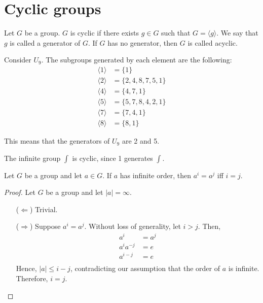\section{Cyclic groups}
    \renewcommand{\leftmark}{March 06, 2024}

    \begin{dfn}
        Let \(G\) be a group. \(G\) is cyclic if there exists \(g\in G\) such that \(G = \langle g\rangle\). We say that \(g\) is called a generator of \(G\). If \(G\) has no generator, then \(G\) is called acyclic.
    \end{dfn}

    \begin{example}
        Consider \(U_9\). The subgroups generated by each element are the following:
        \begin{align*}
            \langle 1\rangle &= \{1\} \\
            \langle 2\rangle &= \{2, 4, 8, 7, 5, 1\} \\
            \langle 4\rangle &= \{4, 7, 1\} \\
            \langle 5\rangle &= \{5, 7, 8, 4, 2, 1\} \\
            \langle 7\rangle &= \{7, 4, 1\} \\
            \langle 8\rangle &= \{8, 1\} 
        \end{align*}

        This means that the generators of \(U_9\) are 2 and 5.
    \end{example}

    \begin{example}
        The infinite group \(\int\) is cyclic, since 1 generates \(\int\).
    \end{example}

    \begin{thm}
        Let \(G\) be a group and let \(a \in G\). If \(a\) has infinite order, then \(a^i = a^j\) iff \(i = j\).
    \end{thm}

    \begin{proof}
        Let \(G\) be a group and let \(|a| = \infty\).

        \begin{itemize}
            \item[(\(\Leftarrow\))] Trivial.
            \item[(\(\Rightarrow\))] Suppose \(a^i = a^j\). Without loss of generality, let \(i > j\). Then,
            \begin{align*}
                a^i &= a^j \\
                a^ia^{-j} &= e \\
                a^{i - j} &= e \\
            \end{align*}
            Hence, \(|a| \leq i - j\), contradicting our assumption that the order of \(a\) is infinite. Therefore, \(i = j\).
        \end{itemize}
    \end{proof}

